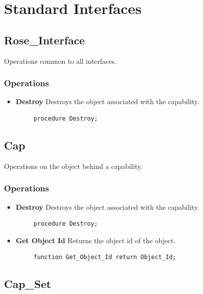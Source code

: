 \section{Standard Interfaces}

\subsection{Rose\_Interface}

Operations common to all interfaces.

\subsubsection{Operations}

\begin{itemize}
    \item \textbf{Destroy} Destroys the object associated with the capability.

    \begin{verbatim}
     procedure Destroy;
    \end{verbatim}
\end{itemize}

\subsection{Cap}

Operations on the object behind a capability.

\subsubsection{Operations}

\begin{itemize}
    \item \textbf{Destroy} Destroys the object associated with the capability.

    \begin{verbatim}
     procedure Destroy;
    \end{verbatim}

    \item \textbf{Get Object Id} Returns the object id of the object.

    \begin{verbatim}
     function Get_Object_Id return Object_Id;
    \end{verbatim}
\end{itemize}

\subsection{Cap\_Set}

